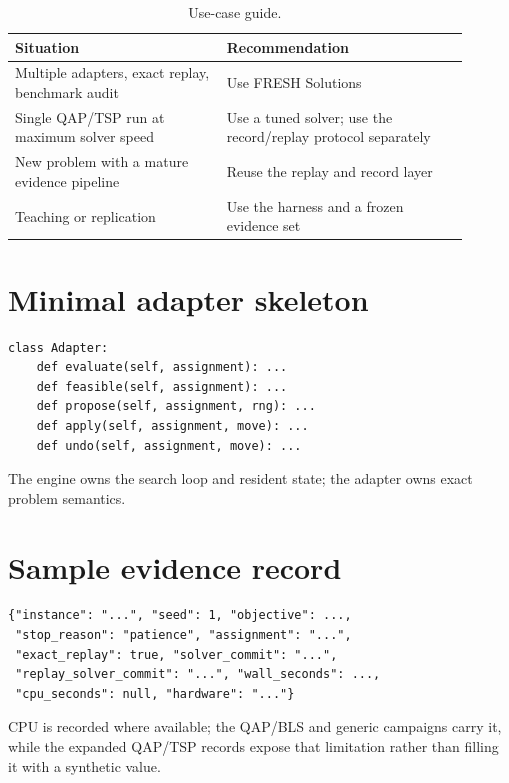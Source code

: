 \documentclass[10pt]{article}
\begin{document}
\begin{table}[H]
\centering
\caption{Use-case guide.}
\small
\begin{tabular}{p{0.42\linewidth}p{0.48\linewidth}}
\toprule
Situation & Recommendation \\
\midrule
Multiple adapters, exact replay, benchmark audit & Use FRESH Solutions \\
Single QAP/TSP run at maximum solver speed & Use a tuned solver; use the record/replay protocol separately \\
New problem with a mature evidence pipeline & Reuse the replay and record layer \\
Teaching or replication & Use the harness and a frozen evidence set \\
\bottomrule
\end{tabular}
\end{table}

\section{Minimal adapter skeleton}

\begin{verbatim}
class Adapter:
    def evaluate(self, assignment): ...
    def feasible(self, assignment): ...
    def propose(self, assignment, rng): ...
    def apply(self, assignment, move): ...
    def undo(self, assignment, move): ...
\end{verbatim}

The engine owns the search loop and resident state; the adapter owns exact problem semantics.

\section{Sample evidence record}

\begin{verbatim}
{"instance": "...", "seed": 1, "objective": ...,
 "stop_reason": "patience", "assignment": "...",
 "exact_replay": true, "solver_commit": "...",
 "replay_solver_commit": "...", "wall_seconds": ...,
 "cpu_seconds": null, "hardware": "..."}
\end{verbatim}

CPU is recorded where available; the QAP/BLS and generic campaigns carry it, while the expanded
QAP/TSP records expose that limitation rather than filling it with a synthetic value.
\end{document}
